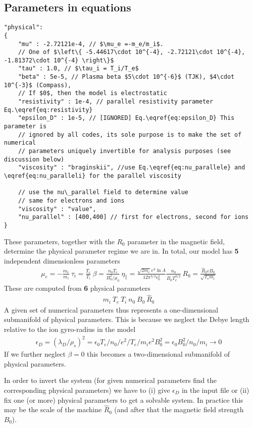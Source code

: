 \subsection{Parameters in equations} \label{sec:physical}
\begin{verbatim}
"physical":
{
    "mu" : -2.72121e-4, // $\mu_e =-m_e/m_i$.
    // One of $\left\{ -5.44617\cdot 10^{-4}, -2.72121\cdot 10^{-4}, -1.81372\cdot 10^{-4} \right\}$
    "tau" : 1.0, // $\tau_i = T_i/T_e$
    "beta" : 5e-5, // Plasma beta $5\cdot 10^{-6}$ (TJK), $4\cdot 10^{-3}$ (Compass),
    // If $0$, then the model is electrostatic
    "resistivity" : 1e-4, // parallel resistivity parameter Eq.\eqref{eq:resistivity}
    "epsilon_D" : 1e-5, // [IGNORED] Eq.\eqref{eq:epsilon_D} This parameter is
    // ignored by all codes, its sole purpose is to make the set of numerical
    // parameters uniquely invertible for analysis purposes (see discussion below)
    "viscosity" : "braginskii", //use Eq.\eqref{eq:nu_parallele} and \eqref{eq:nu_paralleli} for the parallel viscosity

    // use the nu\_parallel field to determine value
    // same for electrons and ions
    "viscosity" : "value",
    "nu_parallel" : [400,400] // first for electrons, second for ions
}
\end{verbatim}
These parameters, together with the $R_0$ parameter in the magnetic field,
determine the physical parameter regime we are in.
In total, our model has \textbf{5} independent dimensionless parameters
\begin{align*}
    \mu_e = -\frac{m_e}{m_i}\ \tau_i = \frac{T_e}{T_i}\ \beta =
    \frac{n_0T_{e}}{B_0^2/\mu_0}\ \eta_\parallel = \frac{\sqrt{2m_e} e^3 \ln
    \Lambda} {12\pi^{3/2} \epsilon_0^2} \frac{n_0} {B_0T_e^{3/2}} \ R_0
    = \frac{\hat R_0 e B_0}{\sqrt{T_{e}m_i}}
\end{align*}
These are computed from \textbf{6} physical parameters
\begin{align*}
    m_i\ T_e\ T_i\ n_0\ B_0\ \hat R_0
\end{align*}
 A given set of numerical parameters thus represents a one-dimensional
 submanifold of physical parameters.
 This is because we neglect the Debye length relative to the ion gyro-radius
 in the model
 \begin{align}\label{eq:epsilon_D}
     \epsilon_D = (\lambda_D/\rho_s)^2 = \epsilon_0 T_e /n_0 /e^2 / T_e/m_i e^2 B_0^2 = \epsilon_0 B_0^2/n_0 /m_i \rightarrow 0
 \end{align}
If we further neglect $\beta=0$ this becomes a two-dimensional submanifold
of physical parameters.
\begin{tcolorbox}[title=Note]
    In order to invert the system (for given numerical parameters find the
    corresponding physical parameters) we have to (i) give $\epsilon_D$ in the
    input file or (ii) fix one (or more) physical
    parameters to get a solvable system.  In practice this may be the scale of
    the machine $\hat R_0$ (and after that the magnetic field strength $B_0$).
\end{tcolorbox}
